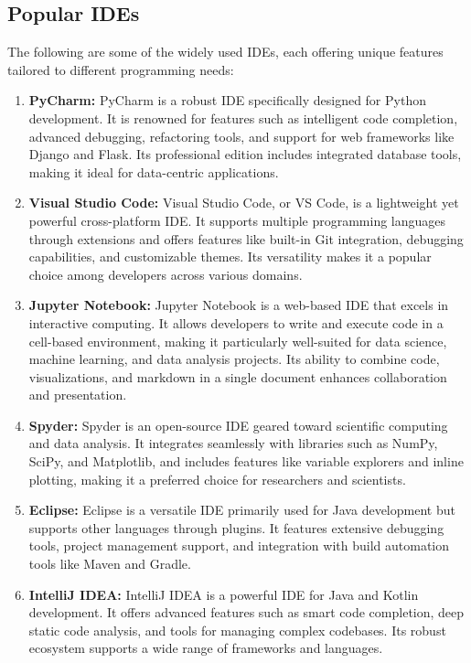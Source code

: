 \subsection{Popular IDEs}

The following are some of the widely used IDEs, each offering unique features tailored to different programming needs:

\begin{enumerate}
	\item \textbf{PyCharm:} 
	PyCharm is a robust IDE specifically designed for Python development. It is renowned for features such as intelligent code completion, advanced debugging, refactoring tools, and support for web frameworks like Django and Flask. Its professional edition includes integrated database tools, making it ideal for data-centric applications.
	
	\item \textbf{Visual Studio Code:} 
	Visual Studio Code, or VS Code, is a lightweight yet powerful cross-platform IDE. It supports multiple programming languages through extensions and offers features like built-in Git integration, debugging capabilities, and customizable themes. Its versatility makes it a popular choice among developers across various domains.
	
	\item \textbf{Jupyter Notebook:} 
	Jupyter Notebook is a web-based IDE that excels in interactive computing. It allows developers to write and execute code in a cell-based environment, making it particularly well-suited for data science, machine learning, and data analysis projects. Its ability to combine code, visualizations, and markdown in a single document enhances collaboration and presentation.
	
	\item \textbf{Spyder:} 
	Spyder is an open-source IDE geared toward scientific computing and data analysis. It integrates seamlessly with libraries such as NumPy, SciPy, and Matplotlib, and includes features like variable explorers and inline plotting, making it a preferred choice for researchers and scientists.
	
	\item \textbf{Eclipse:} 
	Eclipse is a versatile IDE primarily used for Java development but supports other languages through plugins. It features extensive debugging tools, project management support, and integration with build automation tools like Maven and Gradle.
	
	\item \textbf{IntelliJ IDEA:} 
	IntelliJ IDEA is a powerful IDE for Java and Kotlin development. It offers advanced features such as smart code completion, deep static code analysis, and tools for managing complex codebases. Its robust ecosystem supports a wide range of frameworks and languages.
\end{enumerate}

